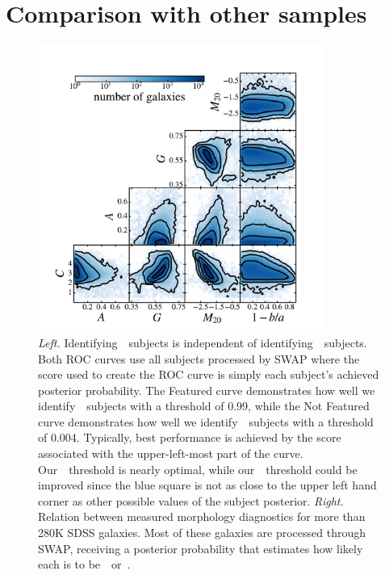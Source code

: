 \section{Comparison with other samples}
\begin{figure}[t!]
\includegraphics[width=3.7in]{Figures/human_machine/A2b.pdf}
\caption{\textit{Left.} Identifying~\feat~subjects is independent of identifying~\notfeat~subjects.  Both ROC curves use all subjects processed by SWAP where the score used to create the ROC curve is simply each subject's achieved posterior probability. The Featured curve demonstrates how well we identify~\feat~subjects with a threshold of 0.99, while the Not Featured curve demonstrates how well we identify~\notfeat~subjects with a threshold of 0.004. Typically, best performance is achieved by the score associated with the upper-left-most part of the curve. Our~\feat~threshold is nearly optimal, while our~\notfeat~threshold could be improved since the blue square is not as close to the upper left hand corner as other possible values of the subject posterior. \textit{Right.} Relation between measured morphology diagnostics for more than 280K SDSS galaxies. Most of these galaxies are processed through SWAP, receiving a posterior probability that estimates how likely each is to be~\feat~or~\notfeat.}
\label{fig: morph thresh}
\end{figure}
